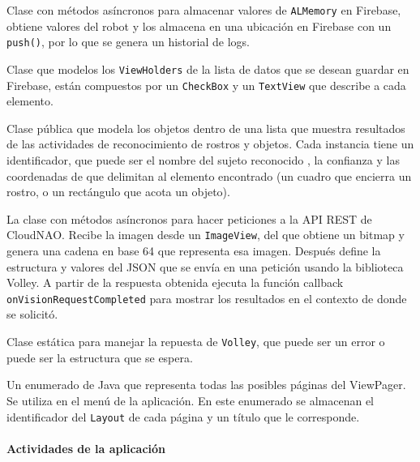 
Clase con métodos asíncronos para almacenar valores de \texttt{ALMemory} en Firebase, obtiene valores del robot y los almacena en una ubicación en Firebase con un \texttt{push()}, por lo que se genera un historial de logs.


Clase que modelos los \texttt{ViewHolders} de la lista de datos que se desean guardar en Firebase, están compuestos por un \texttt{CheckBox} y un \texttt{TextView} que describe a cada elemento.


Clase pública que modela los objetos dentro de una lista que muestra resultados de las actividades de reconocimiento de rostros y objetos. Cada instancia tiene un identificador, que puede ser el nombre del sujeto reconocido , la confianza y las coordenadas de que delimitan al elemento encontrado (un cuadro que encierra un rostro, o un rectángulo que acota un objeto).


La clase con métodos asíncronos para hacer peticiones a la API REST 
de CloudNAO. Recibe la imagen desde un \texttt{ImageView}, del que obtiene un 
bitmap y genera una cadena en base 64 que representa esa imagen. 
Después define la estructura y valores del JSON que se envía en una 
petición usando la biblioteca Volley. A partir de la respuesta 
obtenida ejecuta la función callback \texttt{onVisionRequestCompleted} 
para mostrar los resultados en el contexto de donde se solicitó.




Clase estática para manejar la repuesta de \texttt{Volley}, que puede ser un error o puede ser la estructura que se espera.


Un enumerado de Java que representa todas las posibles páginas del ViewPager. Se utiliza en el menú de la aplicación. En este enumerado se almacenan el identificador del \texttt{Layout} de cada página y un título que le corresponde.


\paragraph{Actividades de la aplicación}

